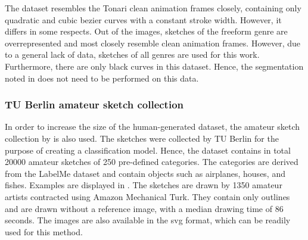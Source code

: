 The dataset resembles the Tonari clean animation frames closely, containing only quadratic and cubic bezier curves with a constant stroke width. However, it differs in some respects. Out of the images, sketches of the freeform genre are overrepresented and most closely resemble clean animation frames. However, due to a general lack of data, sketches of all genres are used for this work. Furthermore, there are only black curves in this dataset. Hence, the segmentation noted in  does not need to be performed on this data.

\subsubsection{TU Berlin amateur sketch collection}

In order to increase the size of the human-generated dataset, the amateur sketch collection by \citet{eitz2012hdhso} is also used. The sketches were collected by TU Berlin for the purpose of creating a classification model. Hence, the dataset contains in total \num{20000} amateur sketches of 250 pre-defined categories. The categories are derived from the LabelMe dataset \citep{DBLP:journals/ijcv/RussellTMF08} and contain objects such as airplanes, houses, and fishes. Examples are displayed in . The sketches are drawn by \num{1350} amateur artists contracted using Amazon Mechanical Turk. They contain only outlines and are drawn without a reference image, with a median drawing time of 86 seconds. The images are also available in the \gls{svg} format, which can be readily used for this method.

